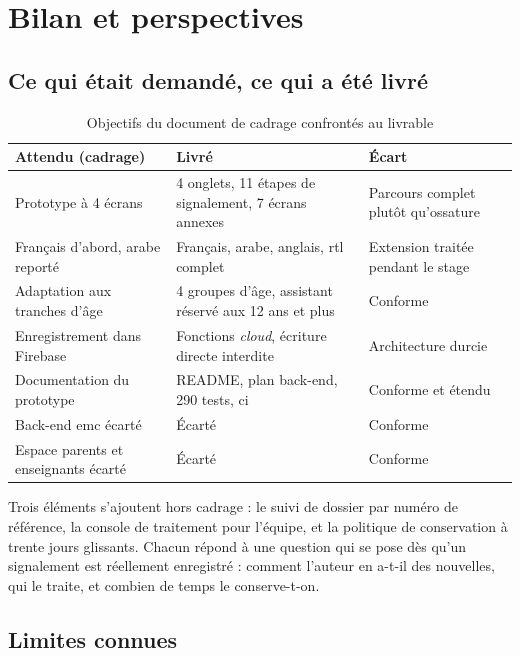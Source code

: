 \documentclass[11pt,a4paper,oneside,openany]{report}
\begin{document}
\chapter{Bilan et perspectives}
\label{chap:bilan}

\section{Ce qui était demandé, ce qui a été livré}

\begin{table}[htbp]
\centering
\small
\caption{Objectifs du document de cadrage confrontés au livrable}
\label{tab:ecart}
\begin{tabularx}{\textwidth}{@{}L{4.0cm} L{4.4cm} X@{}}
\toprule
\textbf{Attendu (cadrage)} & \textbf{Livré} & \textbf{Écart} \\
\midrule
Prototype à 4 écrans & 4 onglets, 11 étapes de signalement, 7 écrans annexes &
Parcours complet plutôt qu'ossature \\
Français d'abord, arabe reporté & Français, arabe, anglais, \gls{rtl} complet &
Extension traitée pendant le stage \\
Adaptation aux tranches d'âge & 4 groupes d'âge, assistant réservé aux 12 ans et
plus & Conforme \\
Enregistrement dans Firebase & Fonctions \emph{cloud}, écriture directe interdite
& Architecture durcie \\
Documentation du prototype & README, plan back-end, 290 tests, \gls{ci} &
Conforme et étendu \\
Back-end \gls{emc} écarté & Écarté & Conforme \\
Espace parents et enseignants écarté & Écarté & Conforme \\
\bottomrule
\end{tabularx}
\end{table}

Trois éléments s'ajoutent hors cadrage : le suivi de dossier par numéro de
référence, la console de traitement pour l'équipe, et la politique de
conservation à trente jours glissants. Chacun répond à une question qui se pose
dès qu'un signalement est réellement enregistré : comment l'auteur en a-t-il des
nouvelles, qui le traite, et combien de temps le conserve-t-on.

\section{Limites connues}
\end{document}
